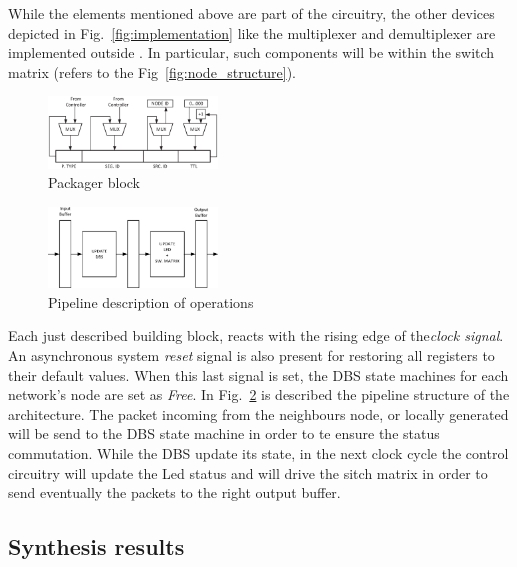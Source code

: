 While the elements mentioned above are part of the \disr{} circuitry, 
the other devices depicted in Fig.~\ref{fig:implementation} like the 
multiplexer and demultiplexer are implemented outside \disr{}.
In particular, such components will be within the switch matrix 
(refers to the Fig~\ref{fig:node_structure}).

\begin{figure}
  \centering
  \includegraphics[width=0.40\textwidth]{pictures/packager.eps}
  \caption{Packager block}
 \label{fig:packager}
\end{figure}

\begin{figure}
  \centering
  \includegraphics[width=0.40\textwidth]{pictures/pipeline.eps}
  \caption{Pipeline description of \disr{} operations}
 \label{fig:pipeline}
\end{figure}

Each just described building block, reacts with the rising edge  of
the\emph{clock signal}. An asynchronous system \emph{reset} signal is
also present for restoring all registers to their default values. When
this last signal is set, the DBS state machines for each network's
node are set as \emph{Free}.  
In Fig.~\ref{fig:pipeline} is described the pipeline structure of the
\disr{} architecture. The packet incoming from the neighbours node, or
locally generated will be send to the DBS state machine in order to te
ensure the status commutation. While the DBS update its state,  in the
next clock cycle the control circuitry will update the Led status and
will drive the sitch matrix in order to send eventually the packets to
the  right output buffer.
\subsection{Synthesis results}

